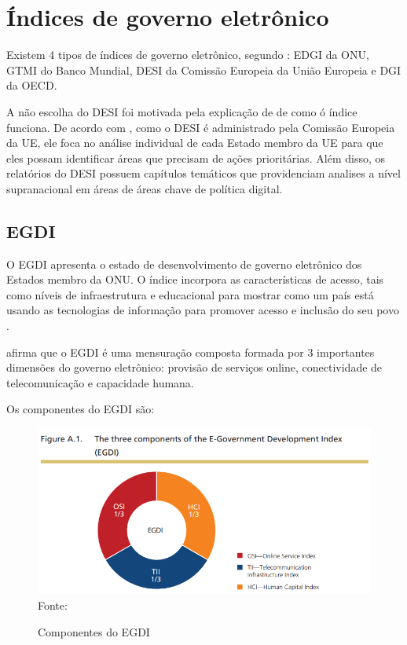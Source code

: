 \section{Índices de governo eletrônico}

Existem 4 tipos de índices de governo eletrônico, segundo \cite{martinez2022egovernment}: EDGI da ONU, GTMI do Banco Mundial, DESI da Comissão Europeia da União Europeia e DGI da OECD.

A não escolha do DESI foi motivada pela explicação de \cite{desi_2022} de como ó índice funciona. De acordo com \cite{desi_2022}, como o DESI é administrado pela Comissão Europeia da UE, ele foca no análise individual de cada Estado membro da UE para que eles possam identificar áreas que precisam de ações prioritárias. Além disso, os relatórios do DESI possuem capítulos temáticos que providenciam analises a nível supranacional em áreas de áreas chave de política digital.

\subsection{EGDI}

O EGDI apresenta o estado de desenvolvimento de governo eletrônico dos Estados membro da ONU. O índice incorpora as características de acesso, tais como níveis de infraestrutura e educacional para mostrar como um país está usando as tecnologias de informação para promover acesso e inclusão do seu povo \cite{ONU_egdi}.

\cite{ONU_egdi} afirma que o EGDI é uma mensuração composta formada por 3 importantes dimensões do governo eletrônico: provisão de serviços online, conectividade de telecomunicação e capacidade humana.

Os componentes do EGDI são:

\begin{figure}[H]
	\centering
	\caption{Componentes do EGDI}
	\includegraphics[width=1\linewidth]{figuras/egdi/egdi_componentes.png}
	\label{fig:egdi_componentes}
	\footnotesize{Fonte: \cite{ONU_egdi_methodology}}
\end{figure}


